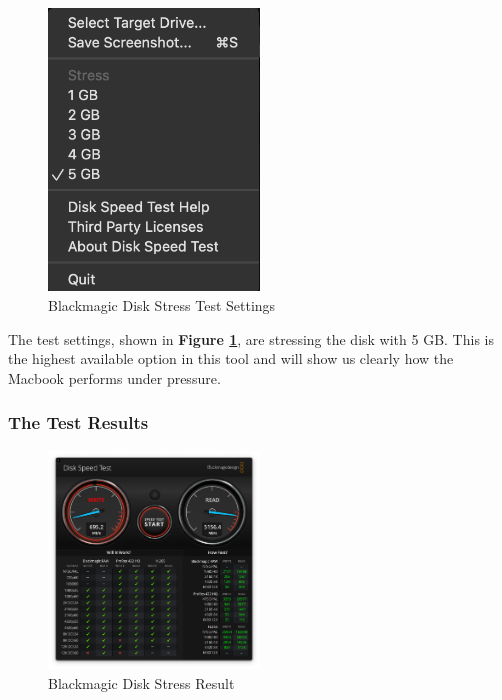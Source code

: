 \documentclass[a4paper]{article}
\begin{document}
\begin{figure}[h!]
    \centering
    \includegraphics[width=0.5\textwidth]{images/blackmagic-disk-stress-settings.png}
    \caption{Blackmagic Disk Stress Test Settings}
    \label{fig:blackmagic-disk-stress-test-settings}
\end{figure}

The test settings, shown in \textbf{Figure \ref{fig:blackmagic-disk-stress-test-settings}}, are stressing the disk with 5 GB. This is the highest available option in this tool and will show us clearly how the Macbook performs under pressure.

\subsubsection{The Test Results}

\begin{figure}[h!]
    \centering
    \includegraphics[width=0.5\textwidth]{images/blackmagic-disk-stress-result.png}
    \caption{Blackmagic Disk Stress Result}
    \label{fig:blackmagic-disk-stress-test-result}
\end{figure}
\end{document}
